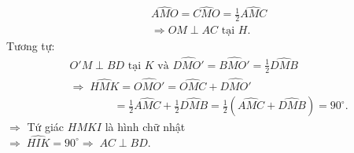 \begin{bt}
{	\begin{align*}
	&\widehat{AMO}=\widehat{CMO}=\frac{1}{2}\widehat{AMC}\\
	&\Rightarrow OM \perp AC \text{ tại } H.
	\end{align*}
	Tương tự:
	\begin{align*}
	&O'M\perp BD \text{ tại } K \text{ và } \widehat{DMO'}=\widehat{BMO'}=\frac{1}{2}\widehat{DMB}\\
	&\Rightarrow\; \widehat{HMK}=\widehat{OMO'}=\widehat{OMC}+\widehat{DMO'}\\
	&\qquad\qquad=\frac{1}{2}\widehat{AMC}+\frac{1}{2}\widehat{DMB} = \frac{1}{2}\left(\widehat{AMC}+\widehat{DMB}\right)=90^\circ.
	\end{align*}
	$\Rightarrow$ Tứ giác $HMKI$ là hình chữ nhật\\
	$\Rightarrow\; \widehat{HIK}=90^\circ \Rightarrow\; AC \perp BD.$
	}
\end{bt}
